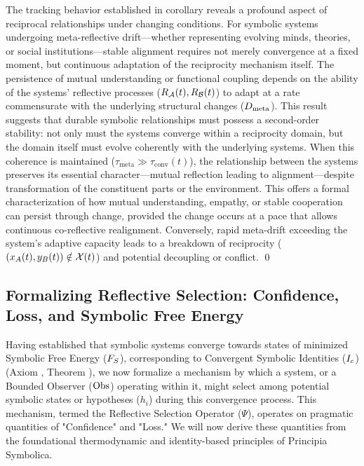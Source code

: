 \begin{scholium}
\label{scholium:bk7_unnamed_scholium_03}
The tracking behavior established in corollary  reveals a profound aspect of reciprocal relationships under changing conditions. For symbolic systems undergoing meta-reflective drift—whether representing evolving minds, theories, or social institutions—stable alignment requires not merely convergence at a fixed moment, but continuous adaptation of the reciprocity mechanism itself. The persistence of mutual understanding or functional coupling depends on the ability of the systems' reflective processes (\(R_{\mathcal{A}}(t), R_{\mathcal{B}}(t)\)) to adapt at a rate commensurate with the underlying structural changes (\(D_{\mathrm{meta}}\)).
This result suggests that durable symbolic relationships must possess a second-order stability: not only must the systems converge within a reciprocity domain, but the domain itself must evolve coherently with the underlying systems. When this coherence is maintained (\(\tau_{\mathrm{meta}} \gg \tau_{\mathrm{conv}}(t)\)), the relationship between the systems preserves its essential character—mutual reflection leading to alignment—despite transformation of the constituent parts or the environment. This offers a formal characterization of how mutual understanding, empathy, or stable cooperation can persist through change, provided the change occurs at a pace that allows continuous co-reflective realignment. Conversely, rapid meta-drift exceeding the system's adaptive capacity leads to a breakdown of reciprocity (\( (x_A(t), y_B(t)) \notin \mathcal{X}(t) \)) and potential decoupling or conflict. \qed
{}
\end{scholium}
\subsection{Formalizing Reflective Selection: Confidence, Loss, and Symbolic Free Energy}
\label{subsec:bk7_formalizing_reflective_selection_confidence_loss_and_symbolic_}
Having established that symbolic systems converge towards states of minimized Symbolic Free Energy (\(F_S\)), corresponding to Convergent Symbolic Identities (\(I_c\)) (Axiom , Theorem ), we now formalize a mechanism by which a system, or a Bounded Observer ($\mathrm{Obs}$) operating within it, might select among potential symbolic states or hypotheses (\(h_i\)) during this convergence process. This mechanism, termed the Reflective Selection Operator ($\Psi$), operates on pragmatic quantities of "Confidence" and "Loss." We will now derive these quantities from the foundational thermodynamic and identity-based principles of Principia Symbolica.
